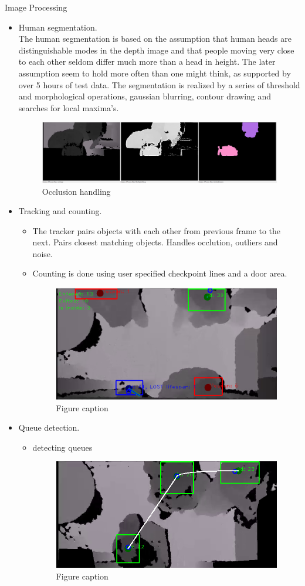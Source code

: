 \documentclass[final,hyperref={pdfpagelabels=false}]{beamer}
\begin{document}
\begin{frame}[t]
\begin{columns}[t]
\begin{column}{.465\textwidth}
\begin{block}{Image Processing}
\begin{itemize}
\item Human segmentation.\\
The human segmentation is based on the assumption that human heads are distinguishable modes in the depth image and that people moving very close to each other seldom differ much more than a head in height. The later assumption seem to hold more often than one might think, as supported by over 5 hours of test data. The segmentation is realized by a series of threshold and morphological operations, gaussian blurring, contour drawing and searches for local maxima's. 
\begin{figure}
\includegraphics[width=1.0\linewidth]{KinectSegmentationIllustration_occlusionHandling_horizontal.png}
\caption{Occlusion handling}
\end{figure}

\item Tracking and counting.
\begin{itemize}
\item{The tracker pairs objects with each other from previous frame to the next. Pairs closest matching objects. Handles occlution, outliers and noise.}
\item{Counting is done using user specified checkpoint lines and a door area.}
\begin{figure}
\includegraphics[width=0.5\linewidth]{trackingExample.png}
\caption{Figure caption}
\end{figure}
\end{itemize}
\item Queue detection.
\begin{itemize}
\item{detecting queues}
\begin{figure}
\includegraphics[width=0.5\linewidth]{visibleQueue.png}
\caption{Figure caption}
\end{figure}
\end{itemize}
\end{itemize}


\end{block}
\end{column}
\end{columns}
\end{frame}
\end{document}

